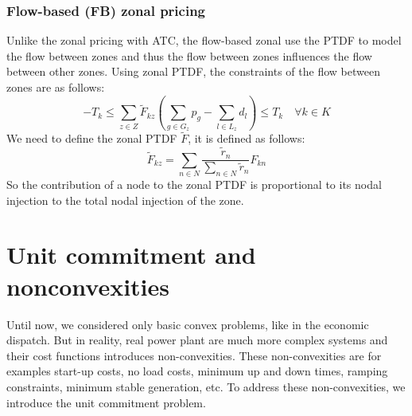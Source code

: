 \documentclass[12pt, openany]{report}
\theoremstyle{definition}
\begin{document}
\subsection{Flow-based (FB) zonal pricing}
Unlike the zonal pricing with ATC, the flow-based zonal use the PTDF to model the flow between zones and thus the flow between zones influences the flow between other zones. Using zonal PTDF, the constraints of the flow between zones are as follows:
\begin{equation}
    -T_k \leq \sum_{z \in Z} \tilde{F}_{kz} (\sum_{g \in G_z} p_g - \sum_{l \in L_z} d_l) \leq T_k \quad \forall k \in K
\end{equation}
We need to define the zonal PTDF $\tilde{F}$, it is defined as follows:
\begin{equation}
    \tilde{F}_{kz} = \sum_{n \in N} \frac{\tilde{r}_n}{\sum_{n \in N} \tilde{r}_n}F_{kn}
\end{equation}
So the contribution of a node to the zonal PTDF is proportional to its nodal injection to the total nodal injection of the zone.
\chapter{Unit commitment and nonconvexities}
Until now, we considered only basic convex problems, like in the economic dispatch. But in reality, real power plant are much more complex systems and their cost functions introduces non-convexities. These non-convexities are for examples start-up costs, no load costs, minimum up and down times, ramping constraints, minimum stable generation, etc. To address these non-convexities, we introduce the unit commitment problem.
\end{document}
